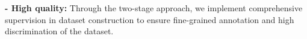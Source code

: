 \noindent %
\textbf{- High quality:} Through the two-stage approach, we implement comprehensive supervision in dataset construction to ensure fine-grained annotation and high discrimination of the dataset.



\begin{table}[hb]
    \centering
\setlength{\abovecaptionskip}{0.1cm}
\setlength{\belowcaptionskip}{0cm}
    \caption{Statistics for Chinese HellaSwag.}
    \label{tab:statistics}
\end{table}


